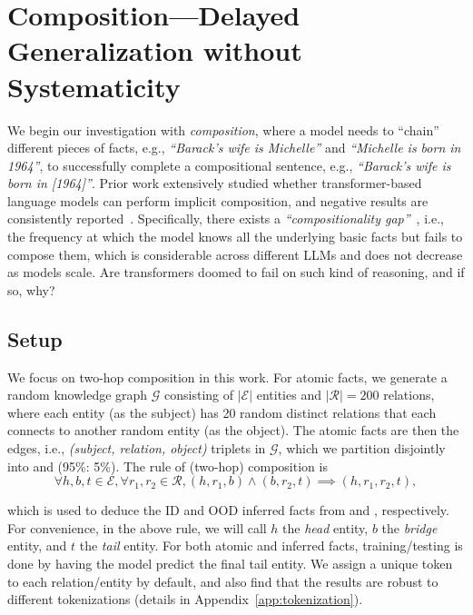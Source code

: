 \section{Composition---Delayed Generalization without Systematicity}

\label{sec:composition}

We begin our investigation with \textit{composition}, where a model needs to ``chain'' different pieces of facts, e.g., \textit{``Barack's wife is Michelle''} and \textit{``Michelle is born in 1964''}, to successfully complete a compositional sentence, e.g., \textit{``Barack's wife is born in [1964]''}. Prior work extensively studied whether transformer-based language models can perform implicit composition, and negative results are consistently reported~\citep{press-etal-2023-measuring, allenzhu2023physics, yang2024large}. Specifically, there exists a \textit{``compositionality gap''}~\citep{press-etal-2023-measuring}, i.e., the frequency at which the model knows all the underlying basic facts but fails to compose them, which is considerable across different LLMs and does not decrease as models scale. Are transformers doomed to fail on such kind of reasoning, and if so, why?

\subsection{Setup}
We focus on two-hop composition in this work. For atomic facts, we generate a random knowledge graph $\mathcal{G}$ consisting of $|\mathcal{E}|$ entities and $|\mathcal{R}|=200$ relations, where each entity (as the subject) has \num{20} random distinct relations that each connects to another random entity (as the object). The atomic facts are then the edges, i.e., \textit{(subject, relation, object)} triplets in $\mathcal{G}$, which we partition disjointly into  and  (\num{95}\%: \num{5}\%). The rule of (two-hop) composition is
\begin{equation}
    \forall h,b,t\in \mathcal{E}, \forall r_1,r_2\in \mathcal{R}, (h,r_1,b) \land (b,r_2,t) \implies (h,r_1,r_2,t),
\end{equation}

which is used to deduce the ID and OOD inferred facts from  and , respectively. For convenience, in the above rule, we will call $h$ the \textit{head} entity, $b$ the \textit{bridge} entity, and $t$ the \textit{tail} entity. For both atomic and inferred facts, training/testing is done by having the model predict the final tail entity. We assign a unique token to each relation/entity by default, and also find that the results are robust to different tokenizations (details in Appendix~\ref{app:tokenization}).

